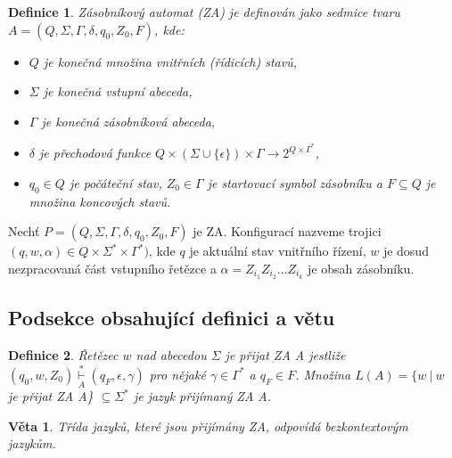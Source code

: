 \documentclass[a4paper, twocolumn, 11pt]{article}
\newtheorem{definice}{Definice}
\newtheorem{veta}{Věta}
\begin{document}
\label{definicia}
\begin{definice}
\emph{Zásobníkový automat} (ZA) je definován jako sedmice tvaru $A =(Q,\Sigma,\Gamma,\delta,q_0,Z_0,F)$, kde: 
\begin{itemize}
        \item $Q$ je konečná množina \emph{vnitřních (řídicích) stavů,} 
        \item $\Sigma$ je konečná \emph{vstupní abeceda}, 
        \item $\Gamma$ je konečná \emph{zásobníková abeceda}, 
        \item $\delta$ je \emph{přechodová funkce} $Q \times (\Sigma \cup \{\epsilon\}) \times \Gamma \rightarrow 2^{Q \times \Gamma^*}$,
        \item $q_0 \in Q$ je \emph{počáteční stav,} $Z_0 \in \Gamma$ je \emph{startovací symbol zásobníku a} $F \subseteq Q$ \emph{je množina koncových stavů.} 
\end{itemize}
\end{definice}

Nechť $P =(Q,\Sigma,\Gamma,\delta,q_0,Z_0,F)$ je ZA. Konfigurací nazveme trojici $(q, w, \alpha) \in Q \times \Sigma^* \times \Gamma^*)$, kde $q$ je aktuální stav vnitřního řízení, $w$ je dosud nezpracovaná část vstupního řetězce a $\alpha = Z_{i_1}Z_{i_2} \dots Z_{i_k}$ je obsah zásobníku.

\subsection{Podsekce obsahující definici a větu}
\begin{definice}
\emph{Řetězec} $w$ \emph{nad abecedou} $\Sigma$ \emph{je přijat ZA} A jestliže $(q_0, w, Z_0) \overset{\ast}{\underset{A}{\vdash}} (q_F,\epsilon, \gamma)$ pro nějaké $\gamma \in \Gamma^*$ a $q_F \in F$. Množina $L(A) = \{w\ |\ w $ je přijat ZA A\} $\subseteq \Sigma^*$ je \emph{jazyk přijímaný ZA} A.
\end{definice}
\begin{veta}
Třída jazyků, které jsou přijímány ZA, odpovídá \emph{bezkontextovým jazykům.}
\end{veta}
\end{document}
